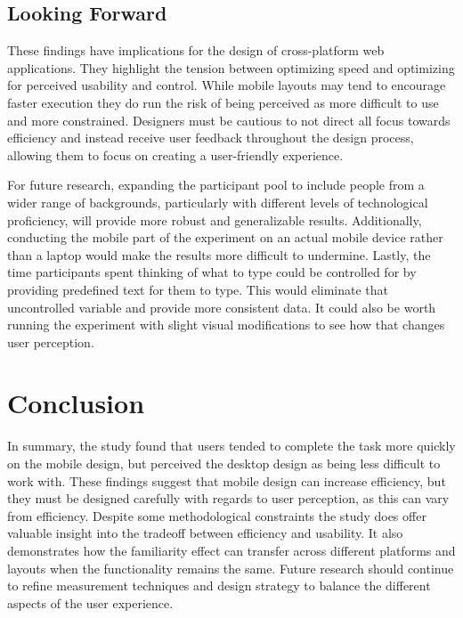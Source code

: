 \documentclass{article}
\begin{document}
\subsection{Looking Forward}

These findings have implications for the design of cross-platform web applications. They highlight the tension between optimizing speed and optimizing for perceived usability and control. While mobile layouts may tend to encourage faster execution they do run the risk of being perceived as more difficult to use and more constrained. Designers must be cautious to not direct all focus towards efficiency and instead receive user feedback throughout the design process, allowing them to focus on creating a user-friendly experience. 


For future research, expanding the participant pool to include people from a wider range of backgrounds, particularly with different levels of technological proficiency, will provide more robust and generalizable results. Additionally, conducting the mobile part of the experiment on an actual mobile device rather than a laptop would make the results more difficult to undermine. Lastly, the time participants spent thinking of what to type could be controlled for by providing predefined text for them to type. This would eliminate that uncontrolled variable and provide more consistent data. It could also be worth running the experiment with slight visual modifications to see how that changes user perception.

\newpage

\section{Conclusion}

In summary, the study found that users tended to complete the task more quickly on the mobile design, but perceived the desktop design as being less difficult to work with. These findings suggest that mobile design can increase efficiency, but they must be designed carefully with regards to user perception, as this can vary from efficiency. Despite some methodological constraints the study does offer valuable insight into the tradeoff between efficiency and usability. It also demonstrates how the familiarity effect can transfer across different platforms and layouts when the functionality remains the same. Future research should continue to refine measurement techniques and design strategy to balance the different aspects of the user experience.
\end{document}

